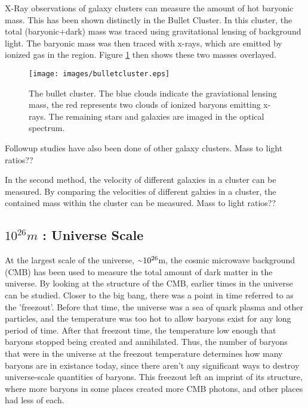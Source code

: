     X-Ray observations of galaxy clusters can measure the amount of hot baryonic mass.
    This has been shown distinctly in the Bullet Cluster\cite{bullet_cluster}.
    In this cluster, the total (baryonic+dark) mass was traced using gravitational lensing of background light.
    The baryonic mass was then traced with x-rays, which are emitted by ionized gas in the region.
    Figure \ref{fig:bullet} then shows these two masses overlayed.

    \begin{figure}[ht]
      \texttt{[image: images/bulletcluster.eps]}
      \caption[The Bullet Cluster]{
        The bullet cluster\cite{bullet_cluster_combined_image}.
        The blue clouds indicate the graviational lensing mass\cite{bullet_cluster}, the red represents two clouds of ionized baryons emitting x-rays\cite{bullet_cluster_chandramap}.
        The remaining stars and galaxies are imaged in the optical spectrum\cite{bullet_cluster_composite}.}
      \label{fig:bullet}
    \end{figure}

    Followup studies have also been done of other galaxy clusters.
    {\color{red}Mass to light ratios??}


    In the second method, the velocity of different galaxies in a cluster can be measured.
    By comparing the velocities of different galxies in a cluster, the contained mass within the cluster can be measured.
    {\color{red}Mass to light ratios??}

  \subsection{$10^{26}m$ : Universe Scale}
    At the largest scale of the universe, $\nicetilde 10^{26}$m, the cosmic microwave background (CMB) has been used to measure the total amount of dark matter in the universe.
    By looking at the structure of the CMB, earlier times in the universe can be studied.
    Closer to the big bang, there was a point in time referred to as the 'freezout'.
    Before that time, the universe was a sea of quark plasma and other particles, and the temperature was too hot to allow baryons exist for any long period of time.
    After that freezout time, the temperature low enough that baryons stopped being created and annihilated.
    Thus, the number of baryons that were in the universe at the freezout temperature determines how many baryons are in existance today, since there aren't any significant ways to destroy universe-scale quantities of baryons.
    This freezout left an imprint of its structure, where more baryons in some places created more CMB photons, and other places had less of each.

